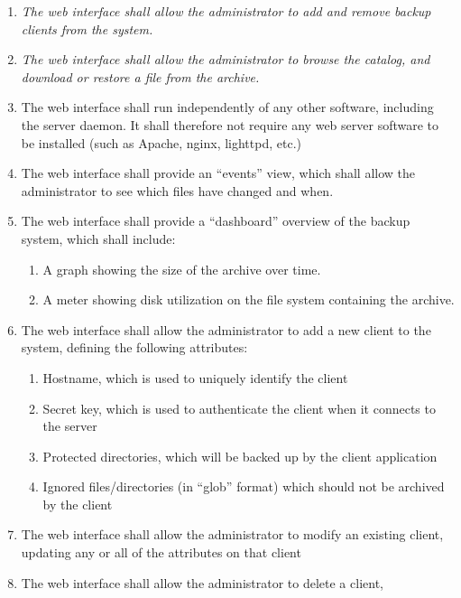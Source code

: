 \begin{enumerate}
    \item \emph{The web interface shall allow the administrator to add and
        remove backup clients from the system.}
    \item \emph{The web interface shall allow the administrator to browse the
        catalog, and download or restore a file from the archive.}
    \item The web interface shall run independently of any other software,
        including the server daemon. It shall therefore not require any web
        server software to be installed (such as Apache, nginx, lighttpd, etc.)
    \item The web interface shall provide an ``events'' view, which shall allow
        the administrator to see which files have changed and when.
    \item The web interface shall provide a ``dashboard'' overview of the
        backup system, which shall include:
        \begin{enumerate}
            \item A graph showing the size of the archive over time.
            \item A meter showing disk utilization on the file system
                containing the archive.
        \end{enumerate}
    \item The web interface shall allow the administrator to add a new client
        to the system, defining the following attributes:
        \begin{enumerate}
            \item Hostname, which is used to uniquely identify the client
            \item Secret key, which is used to authenticate the client when it
                connects to the server
            \item Protected directories, which will be backed up by the client
                application
            \item Ignored files/directories (in ``glob'' format) which should
                not be archived by the client
        \end{enumerate}
    \item The web interface shall allow the administrator to modify an existing
        client, updating any or all of the attributes on that client
    \item The web interface shall allow the administrator to delete a client,

\end{enumerate}
